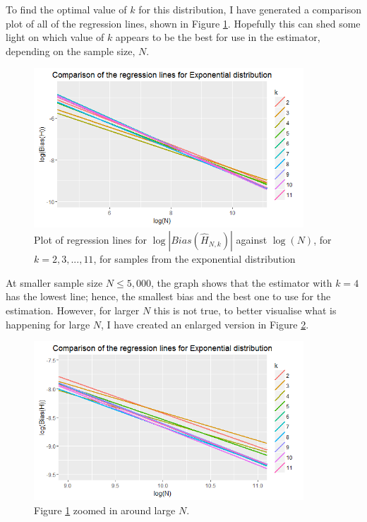 \documentclass[12pt]{report}
\begin{document}
To find the optimal value of $k$ for this distribution, I have generated a comparison plot of all of the regression lines, shown in Figure \ref{expo_comparison_graph}. Hopefully this can shed some light on which value of $k$ appears to be the best for use in the estimator, depending on the sample size, $N$.

\begin{figure}
  \begin{center}
    \includegraphics[width=0.9\textwidth]{./Graphs/Best/ExpoComparison.png}
  \end{center}
\caption{Plot of regression lines for $\log|Bias(\hat{H}_{N, k})|$ against $\log(N)$, for $k=2, 3,..., 11$, for samples from the exponential distribution}
  \label{expo_comparison_graph}
\end{figure}

At smaller sample size $N \leq 5,000$, the graph shows that the estimator with $k=4$ has the lowest line; hence, the smallest bias and the best one to use for the estimation. However, for larger $N$ this is not true, to better visualise what is happening for large $N$, I have created an enlarged version in Figure \ref{expo_comparison_graph_zoom}.

\begin{figure}
  \begin{center}
    \includegraphics[width=0.9\textwidth]{./Graphs/Best/ExpoComparisonZoom.png}
  \end{center}
\caption{Figure \ref{expo_comparison_graph} zoomed in around large $N$.}
  \label{expo_comparison_graph_zoom}
\end{figure}
\end{document}
